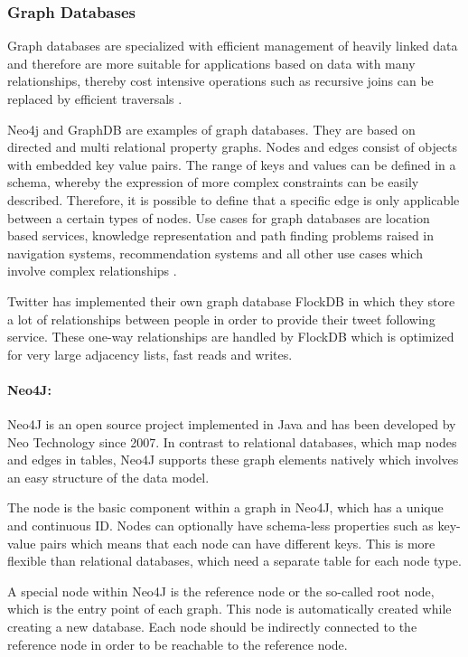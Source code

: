 \subsubsection{Graph Databases}
Graph databases are specialized with efficient management of heavily linked data and therefore are more suitable for applications based on data with many relationships, thereby cost intensive operations such as recursive joins can be replaced by efficient traversals \cite{Hecht:2011}.

Neo4j and GraphDB are examples of graph databases. They are based on directed and multi relational property graphs. Nodes and edges consist of objects with embedded key value pairs. The range of keys and values can be defined in a schema, whereby the expression of more complex constraints can be easily described. Therefore, it is possible to define that a specific edge is only applicable between a certain types of nodes. Use cases for graph databases are location based services, knowledge representation and path finding problems raised in navigation systems, recommendation systems and all other use cases which involve complex relationships \cite{Hecht:2011}.

Twitter has implemented their own graph database FlockDB in which they store a lot of relationships between people in order to provide their tweet following service. These one-way relationships are handled by FlockDB which is optimized for very large adjacency lists, fast reads and writes.

\paragraph{Neo4J:}
Neo4J is an open source project implemented in Java and has been developed by Neo Technology since 2007. In contrast to relational databases, which map nodes and edges in tables, Neo4J supports these graph elements natively which involves an easy structure of the data model.

The node is the basic component within a graph in Neo4J, which has a unique and continuous ID. Nodes can optionally have schema-less properties such as key-value pairs which means that each node can have different keys. This is more flexible than relational databases, which need a separate table for each node type. 

A special node within Neo4J is the reference node or the so-called root node, which is the entry point of each graph. This node is automatically created while creating a new database. Each node should be indirectly connected to the reference node in order to be reachable to the reference node.

